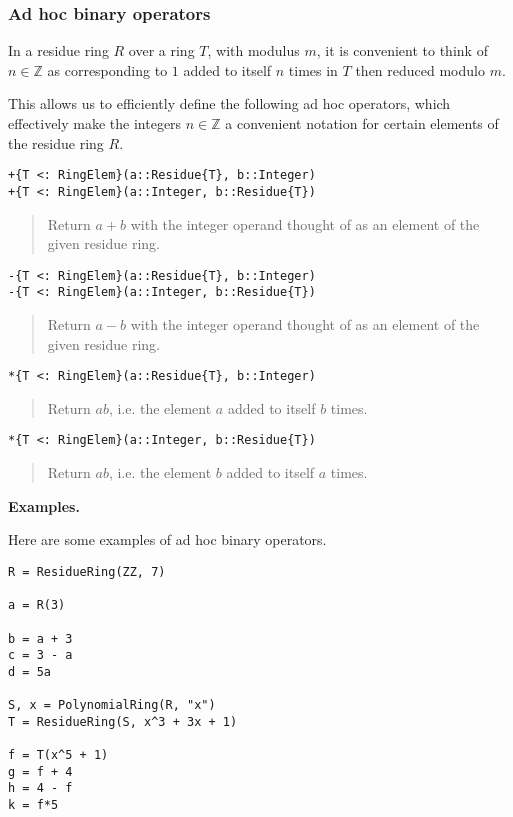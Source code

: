 \documentclass[a4paper,10pt]{article}
\newcommand{\Z}{\mathbb{Z}}
\newcommand{\desc}[1]{\vspace{-3mm}\begin{quote}#1\end{quote}}
\begin{document}
\subsubsection{Ad hoc binary operators}

In a residue ring $R$ over a ring $T$, with modulus $m$, it is convenient
to think of $n \in \Z$ as corresponding to $1$ added to itself $n$ times
in $T$ then reduced modulo $m$.

This allows us to efficiently define the following ad hoc operators, which
effectively make the integers $n \in \Z$ a convenient notation for certain
elements of the residue ring $R$.

\begin{lstlisting}
+{T <: RingElem}(a::Residue{T}, b::Integer)
+{T <: RingElem}(a::Integer, b::Residue{T})
\end{lstlisting}

\desc{Return $a + b$ with the integer operand thought of as an element of 
the given residue ring.}

\begin{lstlisting}
-{T <: RingElem}(a::Residue{T}, b::Integer)
-{T <: RingElem}(a::Integer, b::Residue{T})
\end{lstlisting}

\desc{Return $a - b$ with the integer operand thought of as an element of 
the given residue ring.}

\begin{lstlisting}
*{T <: RingElem}(a::Residue{T}, b::Integer)
\end{lstlisting}

\desc{Return $ab$, i.e. the element $a$ added to itself $b$ times.}

\begin{lstlisting}
*{T <: RingElem}(a::Integer, b::Residue{T})
\end{lstlisting}

\desc{Return $ab$, i.e. the element $b$ added to itself $a$ times.}

\textbf{Examples.}

Here are some examples of ad hoc binary operators.

\begin{lstlisting}
R = ResidueRing(ZZ, 7)

a = R(3)

b = a + 3
c = 3 - a
d = 5a

S, x = PolynomialRing(R, "x")
T = ResidueRing(S, x^3 + 3x + 1)

f = T(x^5 + 1)
g = f + 4
h = 4 - f
k = f*5
\end{lstlisting}
\end{document}
